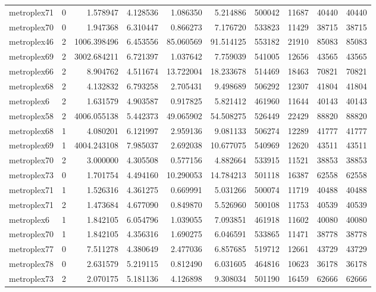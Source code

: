 \begin{longtable}{|l|r|r|r|r|r|r|r|r|r|}
metroplex71 & 0 & 1.578947 & 4.128536 & 1.086350 & 5.214886 & 500042 & 11687 & 40440 & 40440 \\
metroplex70 & 0 & 1.947368 & 6.310447 & 0.866273 & 7.176720 & 533823 & 11429 & 38715 & 38715 \\
metroplex46 & 2 & 1006.398496 & 6.453556 & 85.060569 & 91.514125 & 553182 & 21910 & 85083 & 85083 \\
metroplex69 & 2 & 3002.684211 & 6.721397 & 1.037642 & 7.759039 & 541005 & 12656 & 43565 & 43565 \\
metroplex66 & 2 & 8.904762 & 4.511674 & 13.722004 & 18.233678 & 514469 & 18463 & 70821 & 70821 \\
metroplex68 & 2 & 4.132832 & 6.793258 & 2.705431 & 9.498689 & 506292 & 12307 & 41804 & 41804 \\
metroplex6 & 2 & 1.631579 & 4.903587 & 0.917825 & 5.821412 & 461960 & 11644 & 40143 & 40143 \\
metroplex58 & 2 & 4006.055138 & 5.442373 & 49.065902 & 54.508275 & 526449 & 22429 & 88820 & 88820 \\
metroplex68 & 1 & 4.080201 & 6.121997 & 2.959136 & 9.081133 & 506274 & 12289 & 41777 & 41777 \\
metroplex69 & 1 & 4004.243108 & 7.985037 & 2.692038 & 10.677075 & 540969 & 12620 & 43511 & 43511 \\
metroplex70 & 2 & 3.000000 & 4.305508 & 0.577156 & 4.882664 & 533915 & 11521 & 38853 & 38853 \\
metroplex73 & 0 & 1.701754 & 4.494160 & 10.290053 & 14.784213 & 501118 & 16387 & 62558 & 62558 \\
metroplex71 & 1 & 1.526316 & 4.361275 & 0.669991 & 5.031266 & 500074 & 11719 & 40488 & 40488 \\
metroplex71 & 2 & 1.473684 & 4.677090 & 0.849870 & 5.526960 & 500108 & 11753 & 40539 & 40539 \\
metroplex6 & 1 & 1.842105 & 6.054796 & 1.039055 & 7.093851 & 461918 & 11602 & 40080 & 40080 \\
metroplex70 & 1 & 1.842105 & 4.356316 & 1.690275 & 6.046591 & 533865 & 11471 & 38778 & 38778 \\
metroplex77 & 0 & 7.511278 & 4.380649 & 2.477036 & 6.857685 & 519712 & 12661 & 43729 & 43729 \\
metroplex78 & 0 & 2.631579 & 5.219115 & 0.812490 & 6.031605 & 464816 & 10623 & 36178 & 36178 \\
metroplex73 & 2 & 2.070175 & 5.181136 & 4.126898 & 9.308034 & 501190 & 16459 & 62666 & 62666 \\

\end{longtable}
